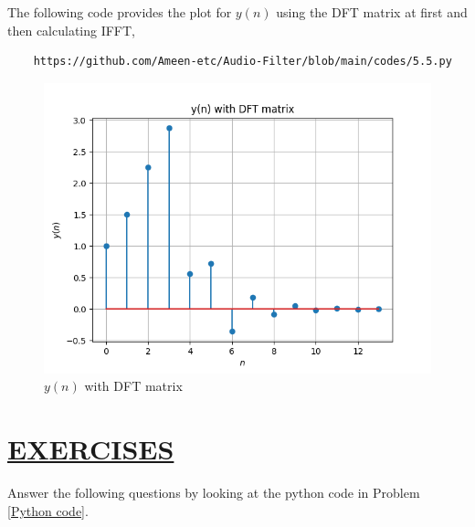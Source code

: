\documentclass[journal,12pt,twocolumn]{IEEEtran}
\theoremstyle{remark}
\begin{document}
\begin{enumerate}[label=\thesection.\arabic*]
The following code provides the plot for $y(n)$ using the DFT matrix at first and then calculating IFFT,
\begin{lstlisting}
    https://github.com/Ameen-etc/Audio-Filter/blob/main/codes/5.5.py
\end{lstlisting}
\begin{figure}[h!]
    \centering
    \includegraphics[width=\columnwidth]{figs/dft.png}
    \caption{$y(n)$ with DFT matrix}
    \label{fig:DFTMT}
\end{figure}
\end{enumerate}
\section{\underline{EXERCISES}}
\noindent Answer the following questions by looking at the python code in Problem \ref{Python code}.
\end{document}
